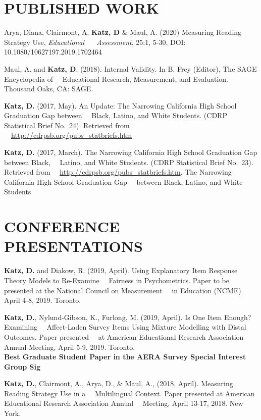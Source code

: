 \documentclass[11pt, oneside]{memoir}
\begin{document}
\hypertarget{published-work}{%
\section{PUBLISHED WORK}\label{published-work}}

Arya, Diana, Clairmont, A. \textbf{Katz, D} \& Maul, A. (2020) Measuring
Reading Strategy Use, \emph{Educational ~~ Assessment}, 25:1, 5-30, DOI:
10.1080/10627197.2019.1702464

Maul, A. and \textbf{Katz, D}. (2018). Internal Validity. In B. Frey
(Editor), The SAGE Encyclopedia of ~~Educational Research, Measurement,
and Evaluation. Thousand Oaks, CA: SAGE.

\textbf{Katz, D.} (2017, May). An Update: The Narrowing California High
School Graduation Gap between ~~Black, Latino, and White Students. (CDRP
Statistical Brief No.~24). Retrieved from
~~\url{http://cdrpsb.org/pubs_statbriefs.htm}

\textbf{Katz, D.} (2017, March). The Narrowing California High School
Graduation Gap between Black, ~~Latino, and White Students. (CDRP
Statistical Brief No.~23). Retrieved from
~~\url{http://cdrpsb.org/pubs_statbriefs.htm}. The Narrowing California
High School Graduation Gap ~~between Black, Latino, and White Students

\vspace{7mm}

\hypertarget{conference-presentations}{%
\section{CONFERENCE PRESENTATIONS}\label{conference-presentations}}

\textbf{Katz, D.} and Diakow, R. (2019, April). Using Explanatory Item
Response Theory Models to Re-Examine ~~Fairness in Psychometrics. Paper
to be presented at the National Council on Measurement ~~in Education
(NCME) April 4-8, 2019. Toronto.

\textbf{Katz, D.}, Nylund-Gibson, K., Furlong, M. (2019, April). Is One
Item Enough? Examining ~~Affect-Laden Survey Items Using Mixture
Modelling with Distal Outcomes. Paper presented ~~at American
Educational Research Association Annual Meeting, April 5-9, 2019.
Toronto.\\
\textbf{Best Graduate Student Paper in the AERA Survey Special Interest
Group Sig}

\textbf{Katz, D.}, Clairmont, A., Arya, D., \& Maul, A., (2018, April).
Measuring Reading Strategy Use in a ~~Multilingual Context. Paper
presented at American Educational Research Association Annual ~~Meeting,
April 13-17, 2018. New York.
\end{document}
